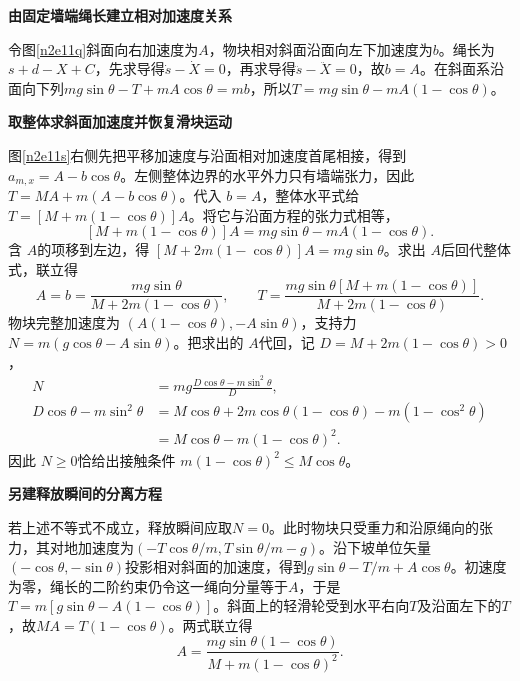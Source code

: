 \begin{solution}\textbf{由固定墙端绳长建立相对加速度关系}\par\nobreak
令图\ref{n2e11q}斜面向右加速度为$A$，物块相对斜面沿面向左下加速度为$b$。绳长为$s+d-X+C$，先求导得$\dot s-\dot X=0$，再求导得$\ddot s-\ddot X=0$，故$b=A$。在斜面系沿面向下列$mg\sin\theta-T+mA\cos\theta=mb$，所以$T=mg\sin\theta-mA(1-\cos\theta)$。



\par\medskip{}\noindent\textbf{取整体求斜面加速度并恢复滑块运动}\par\nobreak
图\ref{n2e11s}右侧先把平移加速度与沿面相对加速度首尾相接，得到 $a_{m,x}=A-b\cos\theta$。左侧整体边界的水平外力只有墙端张力，因此 $T=MA+m(A-b\cos\theta)$。代入 $b=A$，整体水平式给 $T=[M+m(1-\cos\theta)]A$。将它与沿面方程的张力式相等，
\[
 [M+m(1-\cos\theta)]A=mg\sin\theta-mA(1-\cos\theta).
\]
含 $A$的项移到左边，得 $[M+2m(1-\cos\theta)]A=mg\sin\theta$。求出 $A$后回代整体式，联立得
\[
 A=b=\frac{mg\sin\theta}{M+2m(1-\cos\theta)},\qquad
 T=\frac{mg\sin\theta[M+m(1-\cos\theta)]}{M+2m(1-\cos\theta)}.
\]
物块完整加速度为 $(A(1-\cos\theta),-A\sin\theta)$，支持力 $N=m(g\cos\theta-A\sin\theta)$。把求出的 $A$代回，记 $D=M+2m(1-\cos\theta)>0$，
\begin{align*}
 N&=mg\frac{D\cos\theta-m\sin^2\theta}{D},\\
 D\cos\theta-m\sin^2\theta
 &=M\cos\theta+2m\cos\theta(1-\cos\theta)-m(1-\cos^2\theta)\\
 &=M\cos\theta-m(1-\cos\theta)^2.
\end{align*}
因此 $N\ge0$恰给出接触条件 $m(1-\cos\theta)^2\le M\cos\theta$。



\par\medskip{}\noindent\textbf{另建释放瞬间的分离方程}\par\nobreak
若上述不等式不成立，释放瞬间应取$N=0$。此时物块只受重力和沿原绳向的张力，其对地加速度为$(-T\cos\theta/m,T\sin\theta/m-g)$。沿下坡单位矢量$(-\cos\theta,-\sin\theta)$投影相对斜面的加速度，得到$g\sin\theta-T/m+A\cos\theta$。初速度为零，绳长的二阶约束仍令这一绳向分量等于$A$，于是$T=m[g\sin\theta-A(1-\cos\theta)]$。斜面上的轻滑轮受到水平右向$T$及沿面左下的$T$，故$MA=T(1-\cos\theta)$。两式联立得
\[A=\frac{mg\sin\theta(1-\cos\theta)}{M+m(1-\cos\theta)^2}.\]



\end{solution}
